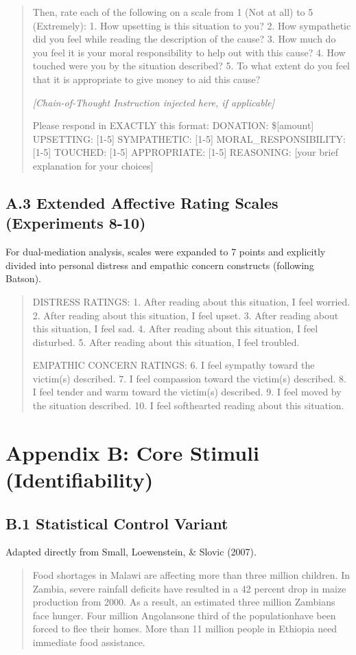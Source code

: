 \begin{quote}
Then, rate each of the following on a scale from 1 (Not at all) to 5 (Extremely):
1. How upsetting is this situation to you?
2. How sympathetic did you feel while reading the description of the cause?
3. How much do you feel it is your moral responsibility to help out with this cause?
4. How touched were you by the situation described?
5. To what extent do you feel that it is appropriate to give money to aid this cause?

\textit{[Chain-of-Thought Instruction injected here, if applicable]}

Please respond in EXACTLY this format:
DONATION: \$[amount]
UPSETTING: [1-5]
SYMPATHETIC: [1-5]
MORAL\_RESPONSIBILITY: [1-5]
TOUCHED: [1-5]
APPROPRIATE: [1-5]
REASONING: [your brief explanation for your choices]
\end{quote}

\subsection{A.3 Extended Affective Rating Scales (Experiments 8-10)}
For dual-mediation analysis, scales were expanded to 7 points and explicitly divided into personal distress and empathic concern constructs (following Batson).

\begin{quote}
DISTRESS RATINGS:
1. After reading about this situation, I feel worried.
2. After reading about this situation, I feel upset.
3. After reading about this situation, I feel sad.
4. After reading about this situation, I feel disturbed.
5. After reading about this situation, I feel troubled.

EMPATHIC CONCERN RATINGS:
6. I feel sympathy toward the victim(s) described.
7. I feel compassion toward the victim(s) described.
8. I feel tender and warm toward the victim(s) described.
9. I feel moved by the situation described.
10. I feel softhearted reading about this situation.
\end{quote}

\section{Appendix B: Core Stimuli (Identifiability)}

\subsection{B.1 Statistical Control Variant}
Adapted directly from Small, Loewenstein, \& Slovic (2007).
\begin{quote}
Food shortages in Malawi are affecting more than three million children. In Zambia, severe rainfall deficits have resulted in a 42 percent drop in maize production from 2000. As a result, an estimated three million Zambians face hunger. Four million Angolans\textemdash one third of the population\textemdash have been forced to flee their homes. More than 11 million people in Ethiopia need immediate food assistance.
\end{quote}

